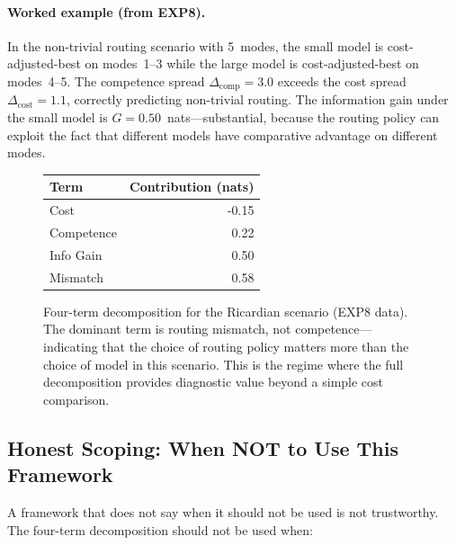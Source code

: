 \paragraph{Worked example (from EXP8).}
In the non-trivial routing scenario with 5~modes, the small model is cost-adjusted-best on modes~1--3 while the large model is cost-adjusted-best on modes~4--5.
The competence spread $\Delta_{\mathrm{comp}} = 3.0$ exceeds the cost spread $\Delta_{\mathrm{cost}} = 1.1$, correctly predicting non-trivial routing.
The information gain under the small model is $G = 0.50$~nats---substantial, because the routing policy can exploit the fact that different models have comparative advantage on different modes.

\begin{figure}[t]
  \centering
  \begin{tabular}{lr}
    \toprule
    Term & Contribution (nats) \\
    \midrule
    Cost & -0.15 \\
    Competence & 0.22 \\
    Info Gain & 0.50 \\
    Mismatch & 0.58 \\
    \bottomrule
  \end{tabular}
  \caption{Four-term decomposition for the Ricardian scenario (EXP8 data).
  The dominant term is routing mismatch, not competence---indicating that the choice of routing policy matters more than the choice of model in this scenario.
  This is the regime where the full decomposition provides diagnostic value beyond a simple cost comparison.}
  \label{fig:four-term-bar}
\end{figure}

\subsection{Honest Scoping: When NOT to Use This Framework}
\label{sec:scoping}

A framework that does not say when it should not be used is not trustworthy.
The four-term decomposition should not be used when:

